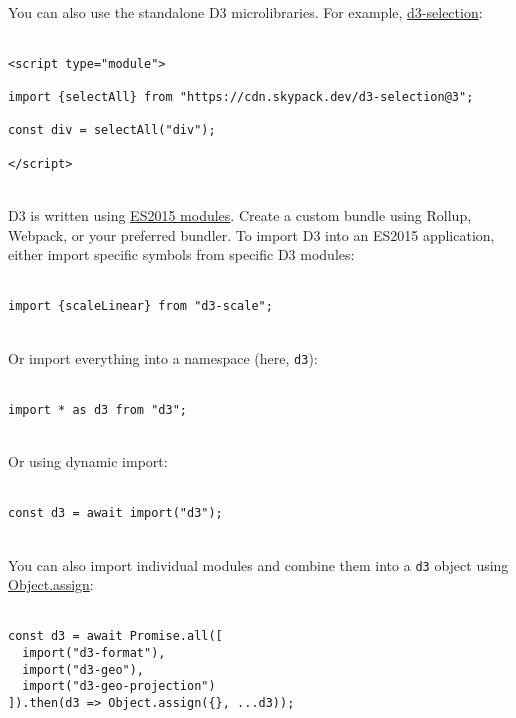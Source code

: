 \documentclass{article}
\begin{document}
\\
You can also use the standalone D3 microlibraries. For example, \href{https://github.com/d3/d3-selection}{d3-selection}:\\
\\
\begin{lstlisting}
<script type="module">

import {selectAll} from "https://cdn.skypack.dev/d3-selection@3";

const div = selectAll("div");

</script>
\end{lstlisting}
\\
D3 is written using \href{http://www.2ality.com/2014/09/es6-modules-final.html}{ES2015 modules}. Create a custom bundle using Rollup, Webpack, or your preferred bundler. To import D3 into an ES2015 application, either import specific symbols from specific D3 modules:\\
\\
\begin{lstlisting}
import {scaleLinear} from "d3-scale";
\end{lstlisting}
\\
Or import everything into a namespace (here, \verb|d3|):\\
\\
\begin{lstlisting}
import * as d3 from "d3";
\end{lstlisting}
\\
Or using dynamic import:\\
\\
\begin{lstlisting}
const d3 = await import("d3");
\end{lstlisting}
\\
You can also import individual modules and combine them into a \verb|d3| object using \href{https://developer.mozilla.org/en-US/docs/Web/JavaScript/Reference/Global_Objects/Object/assign}{Object.assign}:\\
\\
\begin{lstlisting}
const d3 = await Promise.all([
  import("d3-format"),
  import("d3-geo"),
  import("d3-geo-projection")
]).then(d3 => Object.assign({}, ...d3));
\end{lstlisting}
\end{document}
